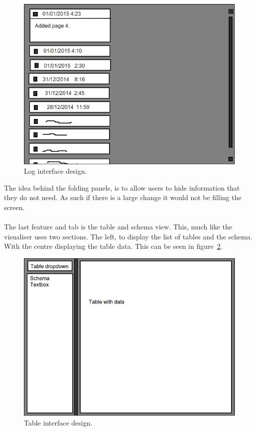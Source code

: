\begin{figure}[H]
	\centering
	\includegraphics[scale=0.32]{images/ui_log.png}
	\caption{Log interface design.}
	\label{fig:des_ui_log}
\end{figure}

The idea behind the folding panels,  is to allow users to hide information that they do not need. As such if there is a large change it would not be filling the screen. 
\\\\
The last feature and tab is the table and schema view. This, much like the visualiser uses two sections. The left, to display the list of tables and the schema. With the centre displaying the table data. This can be seen in figure~\ref{fig:des_ui_table}. 

\begin{figure}[H]
	\centering
	\includegraphics[scale=0.32]{images/ui_table.png}
	\caption{Table interface design.}
	\label{fig:des_ui_table}
\end{figure}
